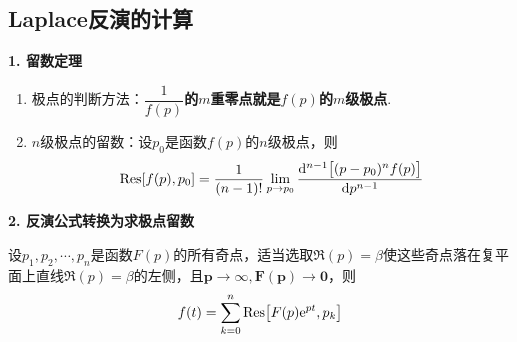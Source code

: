 \subsection{Laplace反演的计算}
\noindent \textbf{1. 留数定理}
\begin{enumerate}[\hspace*{2em}(1) ]
	\item 极点的判断方法：\textbf{$\dfrac{1}{f(p)}$的$m$重零点就是$f(p)$的$m$级极点}.
	\item $n$级极点的留数：设$p_0$是函数$f(p)$的$n$级极点，则
	\begin{equation}
		\text{Res} [f(p), p_0] = \dfrac{1}{(n-1)!} \lim\limits_{p \to p_0} \dfrac{{\rm{d}}^{n-1}\big[(p - p_0)^n f(p)\big]}{{\rm{d}} p^{n-1}}
	\end{equation}
\end{enumerate}


\noindent \textbf{2. 反演公式转换为求极点留数}

设$p_1,p_2,\cdots,p_n$是函数$F(p)$的所有奇点，适当选取$\Re (p) = \beta$使这些奇点落在复平面上直线$\Re(p) = \beta$的左侧，且$\bm{p \to \infty,  F(p) \to 0}$，则
\begin{align}
	f(t) = \sum_{k = 0}^n \text{Res}\big[F(p){\rm{e}}^{pt}, p_k\big]
\end{align}

